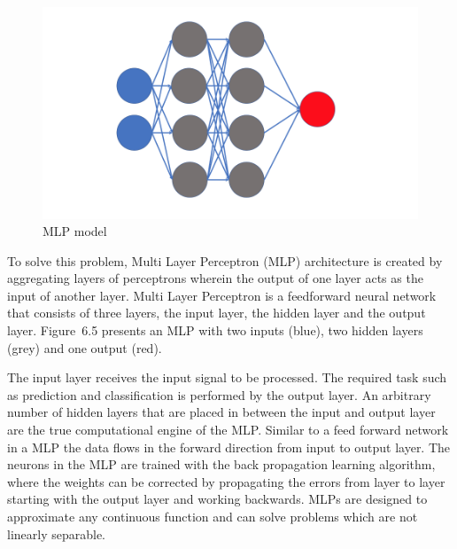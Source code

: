 \begin{figure}[h]
\centering
\includegraphics[width=1\textwidth]{./figures/mlp2.png}
\caption{MLP model}
\label{fig1}
\end{figure}

To solve this problem, Multi Layer Perceptron (MLP) architecture is
created by aggregating layers of perceptrons wherein the output of one
layer acts as the input of another layer. Multi Layer Perceptron
\cite{C} is a feedforward neural network that consists of three
layers, the input layer, the hidden layer and the output
layer. Figure~6.5 presents an MLP with two inputs (blue), two hidden
layers (grey) and one output (red).

The input layer receives the input signal to be processed. The
required task such as prediction and classification is performed by
the output layer. An arbitrary number of hidden layers that are placed
in between the input and output layer are the true computational
engine of the MLP. Similar to a feed forward network in a MLP the data
flows in the forward direction from input to output layer. The neurons
in the MLP are trained with the back propagation learning algorithm,
where the weights can be corrected by propagating the errors from
layer to layer starting with the output layer and working
backwards. MLPs are designed to approximate any continuous function
and can solve problems which are not linearly separable.
